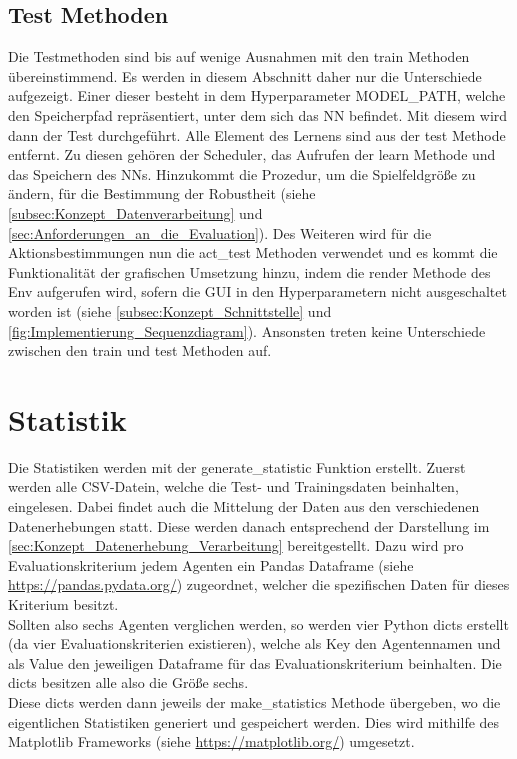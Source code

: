 \subsection{Test Methoden} \label{sec:Implementierung_test_Methode}
Die Testmethoden sind bis auf wenige Ausnahmen mit den train Methoden übereinstimmend. Es werden in diesem Abschnitt daher nur die Unterschiede aufgezeigt. Einer dieser besteht in dem Hyperparameter MODEL\_PATH, welche den Speicherpfad repräsentiert, unter dem sich das NN befindet. Mit diesem wird dann der Test durchgeführt. Alle Element des Lernens sind aus der test Methode entfernt. Zu diesen gehören der Scheduler, das Aufrufen der learn Methode und das Speichern des NNs.
Hinzukommt die Prozedur, um die Spielfeldgröße zu ändern, für die Bestimmung der Robustheit (siehe \autoref{subsec:Konzept_Datenverarbeitung} und \autoref{sec:Anforderungen_an_die_Evaluation}).
Des Weiteren wird für die Aktionsbestimmungen nun die act\_test Methoden verwendet und es kommt die Funktionalität der grafischen Umsetzung hinzu, indem die render Methode des Env aufgerufen wird, sofern die GUI in den Hyperparametern nicht ausgeschaltet worden ist (siehe \autoref{subsec:Konzept_Schnittstelle} und \autoref{fig:Implementierung_Sequenzdiagram}).
Ansonsten treten keine Unterschiede zwischen den train und test Methoden auf.

\section{Statistik} \label{sec:Implementierung_Statistiken}
Die Statistiken werden mit der generate\_statistic Funktion erstellt.
Zuerst werden alle CSV-Datein, welche die Test- und Trainingsdaten beinhalten, eingelesen. Dabei findet auch die Mittelung der Daten aus den verschiedenen Datenerhebungen  statt.
Diese werden danach entsprechend der Darstellung im \autoref{sec:Konzept_Datenerhebung_Verarbeitung} bereitgestellt. 
Dazu wird pro Evaluationskriterium jedem Agenten ein Pandas Dataframe (siehe \url{https://pandas.pydata.org/}) zugeordnet, welcher die spezifischen Daten für dieses Kriterium besitzt.\\
Sollten also sechs Agenten verglichen werden, so werden vier Python dicts erstellt (da vier Evaluationskriterien existieren), welche als Key den Agentennamen und als Value den jeweiligen Dataframe für das Evaluationskriterium beinhalten. Die dicts besitzen alle also die Größe sechs.\\
Diese dicts werden dann jeweils der make\_statistics Methode übergeben, wo die eigentlichen Statistiken generiert und gespeichert werden. Dies wird mithilfe des Matplotlib Frameworks (siehe \url{https://matplotlib.org/}) umgesetzt.